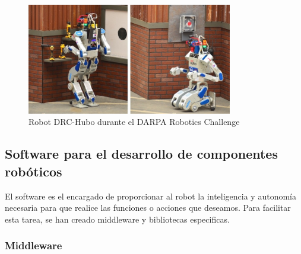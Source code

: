 \begin{itemize}
\begin{figure}[H]
  \begin{center}
    \includegraphics[width=0.8\textwidth]{figures/drchubo.jpg}
		\caption{Robot DRC-Hubo durante el DARPA Robotics Challenge}
		\label{fig.drchubo}
		\end{center}
\end{figure}
\end{itemize}

\subsection{Software para el desarrollo de componentes robóticos}

El software es el encargado de proporcionar al robot la inteligencia y autonomía necesaria para que realice las funciones o acciones que deseamos. Para facilitar esta tarea, se han creado middleware y bibliotecas especificas.

\subsubsection{Middleware}

